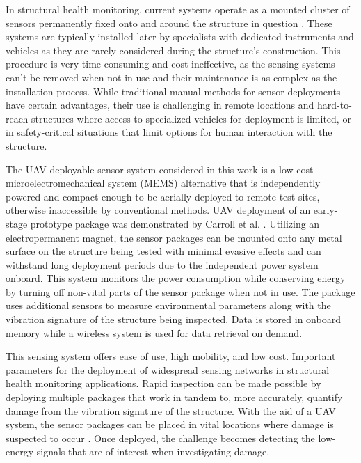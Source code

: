 \documentclass[]{spie}  %
\begin{document}
		In structural health monitoring, current systems operate as a mounted cluster of sensors permanently fixed onto and around the structure in question \cite{Pakzad2008}. These systems are typically installed later by specialists with dedicated instruments and vehicles as they are rarely considered during the structure's construction. This procedure is very time-consuming and cost-ineffective, as the sensing systems can’t be removed when not in use and their maintenance is as complex as the installation process. While traditional manual methods for sensor deployments have certain advantages, their use is challenging in remote locations and hard-to-reach structures where access to specialized vehicles for deployment is limited, or in safety-critical situations that limit options for human interaction with the structure. 

The UAV-deployable sensor system considered in this work is a low-cost microelectromechanical system (MEMS) alternative \cite{Sabato2017} that is independently powered and compact enough to be aerially deployed to remote test sites, otherwise inaccessible by conventional methods. UAV deployment of an early-stage prototype package was demonstrated by Carroll et al. \cite{Carroll2021}. Utilizing an electropermanent magnet, the sensor packages can be mounted onto any metal surface on the structure being tested with minimal evasive effects \cite{Takeuchi2017} and can withstand long deployment periods due to the independent power system onboard. This system monitors the power consumption while conserving energy by turning off non-vital parts of the sensor package when not in use. The package uses additional sensors to measure environmental parameters along with the vibration signature of the structure being inspected. Data is stored in onboard memory while a wireless system is used for data retrieval on demand. 

This sensing system offers ease of use, high mobility, and low cost. Important parameters for the deployment of widespread sensing networks in structural health monitoring applications. Rapid inspection can be made possible by deploying multiple packages that work in tandem to, more accurately, quantify damage from the vibration signature of the structure. With the aid of a UAV system, the sensor packages can be placed in vital locations where damage is suspected to occur \cite{Chen2010}. Once deployed, the challenge becomes detecting the low-energy signals that are of interest when investigating damage. 
\end{document}
